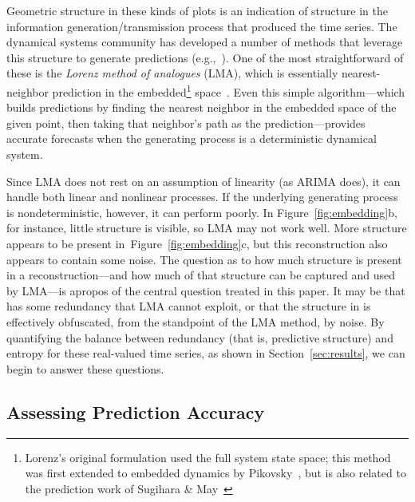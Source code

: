 Geometric structure in these kinds of plots is an indication of
structure in the information generation/transmission process that
produced the time series.  The dynamical systems community has
developed a number of methods that leverage this structure to generate
predictions (e.g.,~\cite{weigend-book,casdagli-eubank92,Smith199250}).
One of the most straightforward of these is the \emph{Lorenz method of
  analogues} (LMA), which is essentially nearest-neighbor prediction
in the embedded\footnote{Lorenz's original formulation used the full
  system state space; 
%
%
this method was first extended to embedded dynamics by
Pikovsky~\cite{pikovsky86-sov}, but is also related to the prediction
work of Sugihara \& May~\cite{sugihara90}}
space~\cite{lorenz-analogues}.  Even this simple algorithm---which
builds predictions by finding the nearest neighbor in the embedded
space of the given point, then taking that neighbor's path as the
prediction---provides accurate forecasts when the generating process
is a deterministic dynamical system.

Since LMA does not rest on an assumption of linearity (as ARIMA does),
it can handle both linear and nonlinear processes.  If the underlying
generating process is nondeterministic, however, it can perform
poorly.  In Figure~\ref{fig:embedding}b, for instance, little
structure is visible, so LMA may not work well.  More structure
appears to be present in~Figure~\ref{fig:embedding}c, but this
reconstruction also appears to contain some noise.  The question as to
how much structure is present in a reconstruction---and how much of
that structure can be captured and used by LMA---is apropos of the
central question treated in this paper.  It may be that \gcc has some
redundancy that LMA cannot exploit, or that the structure in \svdfive
is effectively obfuscated, from the standpoint of the LMA method, by
noise.  By quantifying the balance between redundancy (that is,
predictive structure) and entropy for these real-valued time series,
as shown in Section~\ref{sec:results}, we can begin to answer these
questions.


\subsection{Assessing Prediction Accuracy}
\label{sec:accuracy}

